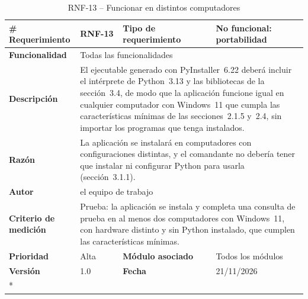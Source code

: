 \begin{longtable}{|p{\rqA}|p{\rqB}|p{\rqC}|p{\rqD}|}
  \caption{RNF-13 -- Funcionar en distintos computadores}\label{tab:rnf-13}\tabularnewline
  \hline
  \textbf{\# Requerimiento} & RNF-13 & \raggedright\textbf{Tipo de requerimiento} & No funcional: portabilidad\tabularnewline\hline
  \raggedright\textbf{Funcionalidad} & \multicolumn{3}{p{\rqBCD}|}{Todas las funcionalidades}\tabularnewline\hline
  \endfirsthead
  \textbf{Descripción} & \multicolumn{3}{p{\rqBCD}|}{El ejecutable generado con PyInstaller~6.22 deberá incluir el intérprete de Python~3.13 y las bibliotecas de la sección~3.4, de modo que la aplicación funcione igual en cualquier computador con Windows~11 que cumpla las características mínimas de las secciones~2.1.5 y~2.4, sin importar los programas que tenga instalados.}\tabularnewline\hline
  \textbf{Razón} & \multicolumn{3}{p{\rqBCD}|}{La aplicación se instalará en computadores con configuraciones distintas, y el comandante no debería tener que instalar ni configurar Python para usarla (sección~3.1.1).}\tabularnewline\hline
  \textbf{Autor} & \multicolumn{3}{p{\rqBCD}|}{el equipo de trabajo}\tabularnewline\hline
  \raggedright\textbf{Criterio de medición} & \multicolumn{3}{p{\rqBCD}|}{Prueba: la aplicación se instala y completa una consulta de prueba en al menos dos computadores con Windows~11, con hardware distinto y sin Python instalado, que cumplen las características mínimas.}\tabularnewline\hline
  \textbf{Prioridad} & Alta & \raggedright\textbf{Módulo asociado} & Todos los módulos\tabularnewline\hline
  \textbf{Versión} & 1.0 & \textbf{Fecha} & 21/11/2026\tabularnewline*\cline{1-4}
\end{longtable}

